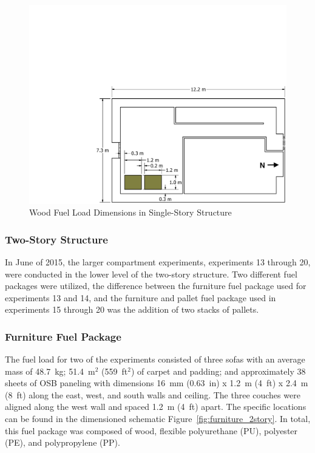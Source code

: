 \documentclass[12pt,oneside]{book}
\begin{document}
\begin{figure}[!ht]
	\includegraphics[width=\columnwidth]{../Figures/Floor_Plans/PDFs/East_Structure/DelCo_2012_East_Structure_Pallets}
	\caption{Wood Fuel Load Dimensions in Single-Story Structure}
	\label{fig:Wood_Fuel_Load_Dimensions}
\end{figure}


\subsubsection*{Two-Story Structure}
\label{sec:suppresion_two}

In June of 2015, the larger compartment experiments, experiments 13 through 20, were conducted in the lower level of the two-story structure.  Two different fuel packages were utilized, the difference between the furniture fuel package used for experiments 13 and 14, and the furniture and pallet fuel package used in experiments 15 through 20 was the addition of two stacks of pallets.   

\subsubsection{Furniture Fuel Package}
\label{sec:fire_suppression_furniture_fuel_2}

The fuel load for two of the experiments consisted of three sofas with an average mass of 48.7~kg; 51.4~m$^2$ (559~ft$^2$) of carpet and padding; and approximately 38 sheets of OSB paneling with dimensions 16~mm (0.63~in) x 1.2~m (4~ft) x 2.4~m (8~ft) along the east, west, and south walls and ceiling. The three couches were aligned along the west wall and spaced 1.2~m (4~ft) apart. The specific locations can be found in the dimensioned schematic Figure~\ref{fig:furniture_2story}. In total, this fuel package was composed of wood, flexible polyurethane (PU), polyester (PE), and polypropylene (PP).
\end{document}
